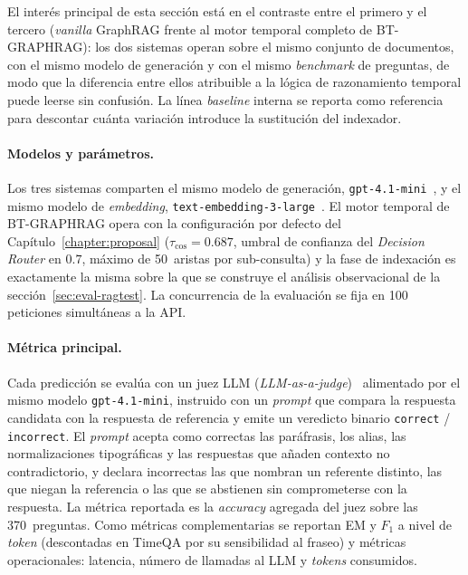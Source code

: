 El interés principal de esta sección está en el contraste entre el primero y el tercero (\emph{vanilla} GraphRAG frente al motor temporal completo de BT-GRAPHRAG): los dos sistemas operan sobre el mismo conjunto de documentos, con el mismo modelo de generación y con el mismo \emph{benchmark} de preguntas, de modo que la diferencia entre ellos atribuible a la lógica de razonamiento temporal puede leerse sin confusión. La línea \emph{baseline} interna se reporta como referencia para descontar cuánta variación introduce la sustitución del indexador.

\paragraph{Modelos y parámetros.} Los tres sistemas comparten el mismo modelo de generación, \texttt{gpt-4.1-mini}~\cite{TODO_gpt41mini}, y el mismo modelo de \emph{embedding}, \texttt{text-embedding-3-large}~\cite{TODO_te3large}. El motor temporal de BT-GRAPHRAG opera con la configuración por defecto del Capítulo~\ref{chapter:proposal} ($\tau_{\cos}=0.687$, umbral de confianza del \emph{Decision Router} en $0.7$, máximo de 50~aristas por sub-consulta) y la fase de indexación es exactamente la misma sobre la que se construye el análisis observacional de la sección~\ref{sec:eval-ragtest}. La concurrencia de la evaluación se fija en 100 peticiones simultáneas a la API.

\paragraph{Métrica principal.} Cada predicción se evalúa con un juez LLM (\emph{LLM-as-a-judge})~\cite{TODO_llm_judge} alimentado por el mismo modelo \texttt{gpt-4.1-mini}, instruido con un \emph{prompt} que compara la respuesta candidata con la respuesta de referencia y emite un veredicto binario \texttt{correct} / \texttt{incorrect}. El \emph{prompt} acepta como correctas las paráfrasis, los alias, las normalizaciones tipográficas y las respuestas que añaden contexto no contradictorio, y declara incorrectas las que nombran un referente distinto, las que niegan la referencia o las que se abstienen sin comprometerse con la respuesta. La métrica reportada es la \emph{accuracy} agregada del juez sobre las 370~preguntas. Como métricas complementarias se reportan EM y $F_1$ a nivel de \emph{token} (descontadas en TimeQA por su sensibilidad al fraseo) y métricas operacionales: latencia, número de llamadas al LLM y \emph{tokens} consumidos.

